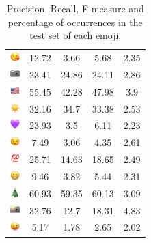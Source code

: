 \documentclass{article}
\begin{document}
\begin{table}
\begin{tabular}{|c|ccc|c|}
\includegraphics[height=0.37cm,width=0.37cm]{img/face_blowing_a_kiss.png} & 12.72 & 3.66 & 5.68 & 2.35\\ 
\includegraphics[height=0.37cm,width=0.37cm]{img/camera.png} & 23.41 & 24.86 & 24.11 & 2.86\\ 
\includegraphics[height=0.37cm,width=0.37cm]{img/United_States.png} & 55.45 & 42.28 & 47.98 & 3.9\\ 
\includegraphics[height=0.37cm,width=0.37cm]{img/sun.png} & 32.16 & 34.7 & 33.38 & 2.53\\ 
\includegraphics[height=0.37cm,width=0.37cm]{img/purple_heart.png} & 23.93 & 3.5 & 6.11 & 2.23\\ 
\includegraphics[height=0.37cm,width=0.37cm]{img/winking_face.png} & 7.49 & 3.06 & 4.35 & 2.61\\ 
\includegraphics[height=0.37cm,width=0.37cm]{img/hundred_points.png} & 25.71 & 14.63 & 18.65 & 2.49\\ 
\includegraphics[height=0.37cm,width=0.37cm]{img/beaming_face_with_smiling_eyes.png} & 9.46 & 3.82 & 5.44 & 2.31\\ 
\includegraphics[height=0.37cm,width=0.37cm]{img/Christmas_tree.png} & 60.93 & 59.35 & 60.13 & 3.09\\ 
\includegraphics[height=0.37cm,width=0.37cm]{img/camera_with_flash.png} & 32.76 & 12.7 & 18.31 & 4.83\\ 
\includegraphics[height=0.37cm,width=0.37cm]{img/winking_face_with_tongue.png} & 5.17 & 1.78 & 2.65 & 2.02\\ 

\hline
\end{tabular}
\caption{\label{table:emoji_detailed} Precision, Recall, F-measure and percentage of occurrences in the test set of each emoji.}
\end{table}
\end{document}
